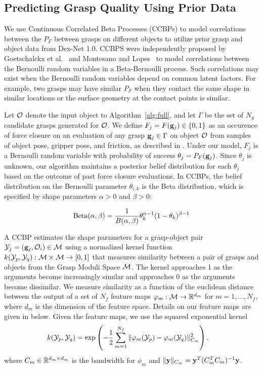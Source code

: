 \subsection{Predicting Grasp Quality Using Prior Data}
We use Continuous Correlated Beta Processes (CCBPs) to model correlations between the $P_F$ between grasps on different objects to utilize prior grasp and object data from Dex-Net 1.0.
CCBPS were independently proposed by Goetschalckx et al.~\cite{goetschalckx2011continuous} and Montesano and Lopes~\cite{montesano2012active} to model correlations between the Bernoulli random variables in a Beta-Bernoulli process.
Such correlations may exist when the Bernoulli random variables depend on common latent factors.
For example, two grasps may have similar $P_F$ when they contact the same shape in similar locations or the surface geometry at the contact points is similar.

Let $\mathcal{O}$ denote the input object to Algorithm~\ref{alg:full}, and let $\Gamma$ be the set of $N_g$ candidate grasps generated for $\mathcal{O}$.
We define $F_{j} = F(\mathbf{g}_{j}) \in \{0, 1\}$ as an occurence of force closure on an evaluation of any grasp $\mathbf{g}_{j} \in \Gamma$ on object $\mathcal{O}$ from samples of object pose, gripper pose, and friction, as described in .
Under our model, $F_j$ is a Bernoulli random variable with probability of success $\theta_{j}= P_F(\mathbf{g}_{j})$.
Since $\theta_j$ is unknown, our algorithm maintains a posterior belief distribution for each $\theta_j$ based on the outcome of past force closure evaluations.
In CCBPs, the belief distribution on the Bernoulli parameter $\theta_{i,k}$ is the Beta distribution, which is specified by shape parameters $\alpha > 0$ and $\beta > 0$:

\vspace{-2ex}
\begin{align*}
	\text{Beta}(\alpha, \beta) = \frac{1}{B(\alpha, \beta)} \theta_k^{\alpha-1} (1 - \theta_k)^{\beta-1}
\end{align*}

A CCBP estimates the shape parameters for a grasp-object pair $\mathcal{Y}_{j} = (\mathbf{g}_{j}, \mathcal{O}_{i}) \in \mathcal{M}$ using a normalized kernel function $k(\mathcal{Y}_p, \mathcal{Y}_q) : \mathcal{M} \times \mathcal{M} \rightarrow [0,1]$ that measures similarity between a pair of grasps and objects from the Grasp Moduli Space $\mathcal{M}$.
The kernel approaches 1 as the arguments become increasingly similar and approaches 0 as the arguments become dissimilar.
We measure similarity as a function of the euclidean distance between the output of a set of $N_f$ feature maps $\varphi_m: \mathcal{M} \rightarrow \mathbb{R}^{d_m}$ for $m = 1, ..., N_f$, where $d_m$ is the dimension of the feature space.
Details on our feature maps are given in  below.
Given the feature maps, we use the squared exponential kernel 
\begin{align*}
	k(\mathcal{Y}_p, \mathcal{Y}_q) &= \exp\left( - \frac{1}{2} \sum \limits_{m=1}^{N_f} \|\varphi_m(\mathcal{Y}_p) - \varphi_m(\mathcal{Y}_q)\|_{C_m}^2 \right).
\end{align*}
\noindent where $C_m \in \mathbb{R}^{d_m \times d_m}$ is the bandwidth for $\phi_m$ and $\| \mathbf{y} \|_{C_m} = \mathbf{y}^T (C_m^T C_m)^{-1} \mathbf{y}$.

